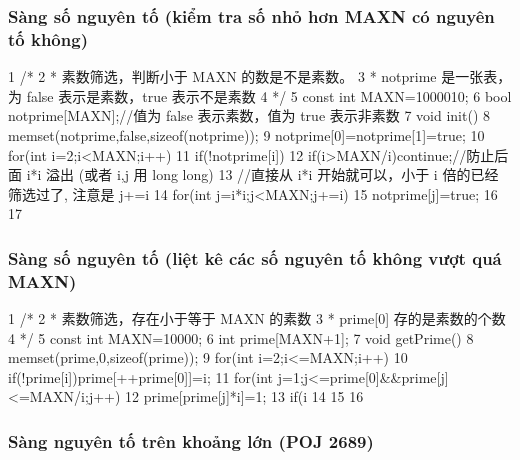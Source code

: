 \documentclass[11pt]{article}
\begin{document}
\subsubsection{Sàng số nguyên tố (kiểm tra số nhỏ hơn MAXN có nguyên tố không)}

\begin{Code}
 1   /*
 2    * 素数筛选，判断小于 MAXN 的数是不是素数。
 3    * notprime 是一张表，为 false 表示是素数，true 表示不是素数
 4    */
 5   const int MAXN=1000010;
 6   bool notprime[MAXN];//值为 false 表示素数，值为 true 表示非素数
 7   void init(){
 8       memset(notprime,false,sizeof(notprime));
 9       notprime[0]=notprime[1]=true;
10       for(int i=2;i<MAXN;i++)
11           if(!notprime[i]){
12               if(i>MAXN/i)continue;//防止后面 i*i 溢出 (或者 i,j 用 long
                    long)
13               //直接从 i*i 开始就可以，小于 i 倍的已经筛选过了, 注意是 j+=i
14               for(int j=i*i;j<MAXN;j+=i)
15                   notprime[j]=true;
16           }
17   }
\end{Code}

\subsubsection{Sàng số nguyên tố (liệt kê các số nguyên tố không vượt quá MAXN)}

\begin{Code}
 1   /*
 2    * 素数筛选，存在小于等于 MAXN 的素数
 3    * prime[0] 存的是素数的个数
 4    */
 5   const int MAXN=10000;
 6   int prime[MAXN+1];
 7   void getPrime(){
 8       memset(prime,0,sizeof(prime));
 9       for(int i=2;i<=MAXN;i++){
10           if(!prime[i])prime[++prime[0]]=i;
11           for(int j=1;j<=prime[0]&&prime[j]<=MAXN/i;j++){
12               prime[prime[j]*i]=1;
13               if(i%
14           }
15       }
16   }
\end{Code}

\subsubsection{Sàng nguyên tố trên khoảng lớn (POJ 2689)}
\end{document}
